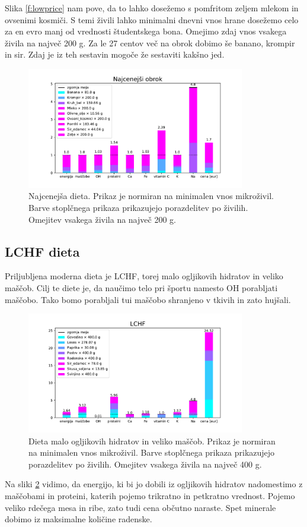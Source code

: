\documentclass[a4paper, 12pt, slovene]{article}
\numberwithin{equation}{section}
\begin{document}
Slika \ref{f:lowprice} nam pove, da to lahko dosežemo s pomfritom zeljem mlekom in ovsenimi kosmiči. S temi živili lahko minimalni dnevni vnos hrane dosežemo celo za en evro manj od vrednosti študentskega bona. Omejimo zdaj vnos vsakega živila na največ 200 g. Za le 27 centov več na obrok dobimo še banano, krompir in sir. Zdaj je iz teh sestavin mogoče že sestaviti kakšno jed.

\begin{figure}[H]
\centering
\includegraphics[width=0.85\textwidth]{grafi/graf_Low_price_200.pdf}
\caption{Najcenejša dieta. Prikaz je normiran na minimalen vnos mikroživil. Barve stoplčnega prikaza prikazujejo porazdelitev po živilih. Omejitev vsakega živila na največ 200 g.}
\label{f:lowprice_200}
\end{figure}


\subsection{LCHF dieta}
Priljubljena moderna dieta je LCHF, torej malo ogljikovih hidratov in veliko maščob. Cilj te diete je, da naučimo telo pri športu namesto OH porabljati maščobo. Tako bomo porabljali tui maščobo shranjeno v tkivih in zato hujšali. 

\begin{figure}[H]
\centering
\includegraphics[width=0.85\textwidth]{grafi/graf_LCHF_400.pdf}
\caption{Dieta malo ogljikovih hidratov in veliko maščob. Prikaz je normiran na minimalen vnos mikroživil. Barve stoplčnega prikaza prikazujejo porazdelitev po živilih. Omejitev vsakega živila na največ 400 g.}
\label{f:LCHF_400}
\end{figure}

Na sliki \ref{f:LCHF_400} vidimo, da energijo, ki bi jo dobili iz ogljikovih hidratov nadomestimo z maščobami in proteini, katerih pojemo trikratno in petkratno vrednost. Pojemo veliko rdečega mesa in ribe, zato tudi cena občutno naraste. Spet minerale dobimo iz maksimalne količine radenske.
\end{document}
